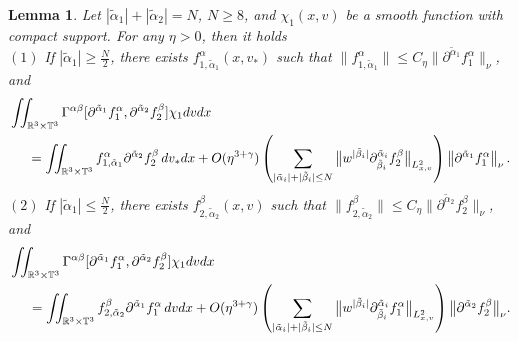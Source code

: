 \documentclass[reqno]{amsart}
\numberwithin{equation}{section}
\newtheorem{lemma}[theorem]{Lemma}
\numberwithin{equation}{section}
\begin{document}
	
	
		\begin{lemma}\label{lem333scd6}
			Let $|\tilde{\alpha}_1| + |\tilde{\alpha}_2| = N$, $N\geq 8$, and \(\chi_1(x, v)\) be a smooth function with  compact support. For any \(\eta > 0\), then it holds \\
			$(1)$
			If $\left|\tilde{\alpha}_1 \right| \geq \frac{N}{2}$, there exists \(f^{\alpha}_{1,\tilde{\alpha}_1}(x,v_*)\) such that \(\|f^{\alpha}_{1,\tilde{\alpha}_1}\| \leq C_\eta\|\partial^{\tilde{\alpha}_1}f^{\alpha}_1\|_{\nu}\), and
			\begin{align}
			&\iint_{\mathbb{R}^3\times\mathbb{T}^3} \Gamma^{\alpha \beta} [\partial^{\tilde{\alpha}_1}f^{\alpha}_1, \partial^{\tilde{\alpha}_2}f^{\beta}_2] \chi_1 dv dx\label{lem33F1}\\
			&\hspace{0.5cm}= \iint_{\mathbb{R}^3\times\mathbb{T}^3} f^{\alpha}_{1,\tilde{\alpha}_1} \partial^{\tilde{\alpha}_2}f^{\beta}_2\, dv_*dx + O(\eta^{3+\gamma}) \left( \sum_{| \tilde{\alpha}_i |+| \tilde{\beta}_i | \le N} \big\| w^{| \tilde{\beta}_i |} \partial_{\tilde{\beta}_i}^{\tilde{\alpha}_i}f^{\beta}_2 \big\|_{L^{2}_{x,v}} \right) \left\| \partial^{\tilde{\alpha}_1}f^{\alpha}_1 \right\|_{\nu}.\notag
			\end{align}
			$(2)$
			If \(\left|\tilde{\alpha}_1 \right| \leq \frac{N}{2}\), there exists \(f^{\beta}_{2,\tilde{\alpha}_2}(x,v)\) such that \(\|f^{\beta}_{2,\tilde{\alpha}_2}\| \leq C_\eta\|\partial^{\tilde{\alpha}_2}f^{\beta}_2\|_{\nu}\), and
			\begin{align}
			&\iint_{\mathbb{R}^3\times\mathbb{T}^3} \Gamma^{\alpha \beta} [\partial^{\tilde{\alpha}_1}f^{\alpha}_1, \partial^{\tilde{\alpha}_2}f^{\beta}_2] \chi_1 dv dx \label{lem33S2}\\
			&\hspace{0.5cm}= \iint_{\mathbb{R}^3\times\mathbb{T}^3} f^{\beta}_{2,\tilde{\alpha}_2} \partial^{\tilde{\alpha}_1}f^{\alpha}_1 \, dvdx + O(\eta^{3+\gamma}) \left( \sum_{| \tilde{\alpha}_i |+| \tilde{\beta}_i | \leq N} \big\| w^{| \tilde{\beta}_i |} \partial_{\tilde{\beta}_i}^{\tilde{\alpha}_i} f^{\alpha}_1\big\|_{L^{2}_{x,v}} \right) \big\| \partial^{\tilde{\alpha}_2}f^{\beta}_2 \big\|_{\nu}.\notag
			\end{align}
		\end{lemma}	
\end{document}

